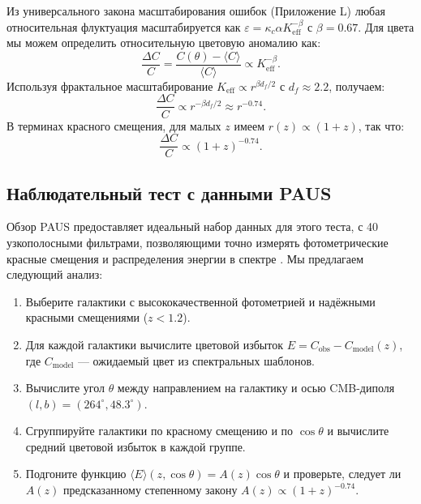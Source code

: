\documentclass[11pt,a4paper]{article}
\newcommand{\Keff}{K_{\mathrm{eff}}}
\begin{document}
	Из универсального закона масштабирования ошибок (Приложение L) любая относительная флуктуация масштабируется как \(\varepsilon = \kappa_c \alpha \Keff^{-\beta}\) с \(\beta = 0.67\). Для цвета мы можем определить относительную цветовую аномалию как:
	\begin{equation}
		\frac{\Delta C}{C} = \frac{C(\theta) - \langle C \rangle}{\langle C \rangle} \propto \Keff^{-\beta}.
	\end{equation}
	Используя фрактальное масштабирование \(\Keff \propto r^{\beta d_f/2}\) с \(d_f \approx 2.2\), получаем:
	\begin{equation}
		\frac{\Delta C}{C} \propto r^{-\beta d_f/2} \approx r^{-0.74}.
	\end{equation}
	В терминах красного смещения, для малых \(z\) имеем \(r(z) \propto (1+z)\), так что:
	\begin{equation}
		\frac{\Delta C}{C} \propto (1+z)^{-0.74}.
	\end{equation}
	
	\subsection{Наблюдательный тест с данными PAUS}
	
	Обзор PAUS предоставляет идеальный набор данных для этого теста, с 40 узкополосными фильтрами, позволяющими точно измерять фотометрические красные смещения и распределения энергии в спектре \cite{Alarcon2019}. Мы предлагаем следующий анализ:
	
	\begin{enumerate}
		\item Выберите галактики с высококачественной фотометрией и надёжными красными смещениями (\(z < 1.2\)).
		\item Для каждой галактики вычислите цветовой избыток \(E = C_{\mathrm{obs}} - C_{\mathrm{model}}(z)\), где \(C_{\mathrm{model}}\) — ожидаемый цвет из спектральных шаблонов.
		\item Вычислите угол \(\theta\) между направлением на галактику и осью CMB-диполя \((l,b) = (264^\circ, 48.3^\circ)\).
		\item Сгруппируйте галактики по красному смещению и по \(\cos\theta\) и вычислите средний цветовой избыток в каждой группе.
		\item Подгоните функцию \(\langle E \rangle(z,\cos\theta) = A(z) \cos\theta\) и проверьте, следует ли \(A(z)\) предсказанному степенному закону \(A(z) \propto (1+z)^{-0.74}\).
	\end{enumerate}
	
\end{document}
